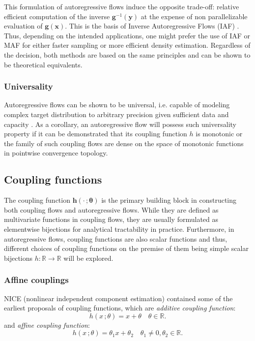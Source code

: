 This formulation of autoregressive flows induce the opposite trade-off: relative
efficient computation of the inverse $\mathbf{g}^{-1}(\mathbf{y})$ at the
expense of non parallelizable evaluation of $\mathbf{g}(\mathbf{x})$. This is
the basis of Inverse Autoregressive Flows (IAF)
\citep{kingmaImprovedVariationalInference2016}. Thus, depending on the intended
applications, one might prefer the use of IAF or MAF for either faster sampling
or more efficient density estimation. Regardless of the decision, both methods
are based on the same principles and can be shown to be theoretical equivalents.

\subsubsection{Universality}

Autoregressive flows can be shown to be universal, i.e. capable of modeling
complex target distribution to arbitrary precision given sufficient data and
capacity \citep{jainiSumofSquaresPolynomialFlow2019,
huangNeuralAutoregressiveFlows2018} . As a corollary, an autoregressive flow
will possess such universality property if it can be demonstrated that its
coupling function $h$ is monotonic or the family of such coupling flows are
dense on the space of monotonic functions in pointwise convergence topology.

\subsection{Coupling functions}


The coupling function $\mathbf{h}(\cdot\,;\mathbf{\theta})$ is the primary
building block in constructing both coupling flows and autoregressive flows.
While they are defined as multivariate functions in coupling flows, they are
usually formulated as elementwise bijections for analytical tractability in
practice. Furthermore, in autoregressive flows, coupling functions are also
scalar functions and thus,  different choices of coupling functions on the
premise of them being simple scalar bijections $h: \mathbb{R} \to \mathbb{R}$
will be explored.

\subsubsection{Affine couplings}

NICE (nonlinear independent component estimation)
\citep{dinhNICENonlinearIndependent2015} contained some of the earliest proposals
of coupling functions, which are \textit{additive coupling function}:
$$
h(x\,;\theta) = x + \theta \quad \theta \in  \mathbb{R}
.$$
and \textit{affine coupling function}:
$$
h(x\,;\theta) = \theta_1 x + \theta_2 \quad \theta_1 \neq 0,
\theta_2 \in  \mathbb{R}
.$$

